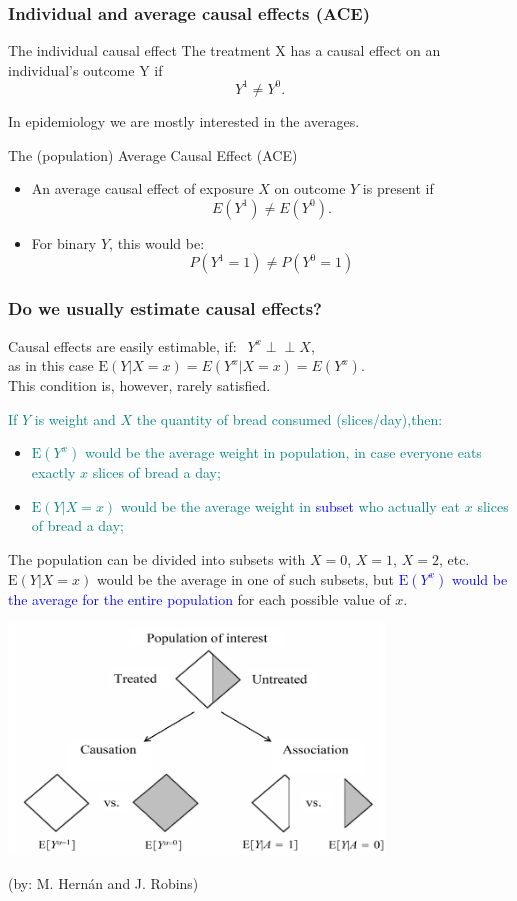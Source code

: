 \documentclass[10pt,dvipsnames,t,handout%
,aspectratio=169%
]{beamer}%
\newcommand{\E}{\mathrm{E}}
\newcommand{\indep}{\perp\!\!\!\!\perp}
\newcommand{\sini}[1]{\textcolor{Blue}{#1}}
\newcommand{\puna}[1]{\textcolor{BrickRed}{#1}}
\newcommand{\nt}[1]{\textcolor{teal}{#1}}
\begin{document}
\begin{frame}
	\frametitle{Individual and average causal effects (ACE)}
\begin{block}{The \puna{individual causal effect}}
	The treatment X has a causal effect on an individual’s outcome Y if 
	\[Y^1 \ne Y^0.\]
\end{block}
	In epidemiology we are mostly interested in the averages.
	\begin{block}{The (population) \puna{Average Causal Effect (ACE)}}
		\begin{itemize}
			\item An average causal effect of exposure $X$ on outcome
			$Y$ is present if
			\[E(Y^{1}) \ne  E(Y^{0}).\] 
			\item For binary $Y$, this would be:
			\[P(Y^{1}=1) \ne  P(Y^{0}=1)\] 
			\end{itemize}
	\end{block}

\end{frame}


\begin{frame}
\frametitle{Do we usually estimate causal effects?}
Causal effects are easily estimable, if:  $ \  \ Y^x \indep X$, \\[2mm]  
as in this case  $\E(Y|X=x) = E(Y^x |X=x) = E(Y^x) $. \\[2mm] 
This condition is, however, rarely satisfied. 

\nt{If $Y$ is weight and $X$ the quantity of bread consumed (slices/day),then:}
	\begin{itemize}
		\item \nt{ $\E(Y^x)$ would be the average weight in population, in case everyone eats exactly $x$ slices of bread a day;} 
		\item\nt{ 
		$\E(Y|X=x)$ would be the average weight in \sini{subset} who actually eat $x$ slices of bread a day;}
	\end{itemize}
	The population can be divided into subsets with $X=0$, $X=1$, $X=2$, etc. $\E(Y|X=x)$ would be the average in one of such subsets, but \sini{$\E(Y^x)$ would be the average for the entire population} for each possible value of  $x$.
	
\end{frame}


\begin{frame}
	\begin{center}
\includegraphics[width=10cm]{ass_vs_caus_hr}
	\end{center}
(by: M. Hern\'an and J. Robins)
\end{frame}
\end{document}
